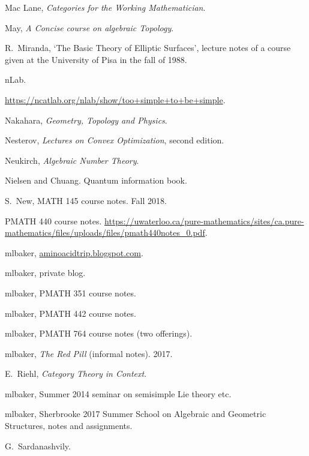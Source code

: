 \begin{thebibliography}{}
Mac Lane, \emph{Categories for the Working Mathematician}.

May, \emph{A Concise course on algebraic Topology}.

R.\ Miranda, `The Basic Theory of Elliptic Surfaces', lecture notes of a course given at the University of Pisa in the fall of 1988.

nLab.

\url{https://ncatlab.org/nlab/show/too+simple+to+be+simple}.

Nakahara, \emph{Geometry, Topology and Physics}.

Nesterov, \emph{Lectures on Convex Optimization}, second edition.

Neukirch, \emph{Algebraic Number Theory}.

Nielsen and Chuang. Quantum information book.

S.\ New, MATH 145 course notes. Fall 2018. %

PMATH 440 course notes. \url{https://uwaterloo.ca/pure-mathematics/sites/ca.pure-mathematics/files/uploads/files/pmath440notes_0.pdf}.

\textsf{mlbaker}, \url{aminoacidtrip.blogspot.com}.

\textsf{mlbaker}, private blog.

\textsf{mlbaker}, PMATH 351 course notes.

\textsf{mlbaker}, PMATH 442 course notes.

\textsf{mlbaker}, PMATH 764 course notes (two offerings).

\textsf{mlbaker}, \emph{The Red Pill} (informal notes). 2017.

E.\ Riehl, \emph{Category Theory in Context}.

\textsf{mlbaker}, Summer 2014 seminar on semisimple Lie theory etc.

\textsf{mlbaker}, Sherbrooke 2017 Summer School on Algebraic and Geometric Structures, notes and assignments.

G.\ Sardanashvily.


\end{thebibliography}
